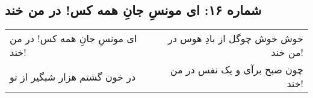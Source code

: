 \begin{center}
\section*{شماره ۱۶: ای مونسِ جانِ همه کس! در من خند}
\label{sec:016}
\begin{longtable}{l p{0.5cm} r}
ای مونسِ جانِ همه کس! در من خند!
&&
خوش خوش چوگل از بادِ هوس در من خند!
\\
در خون گشتم هزار شبگیر از تو
&&
چون صبح برآی و یک نفس در من خند!
\\
\end{longtable}
\end{center}
